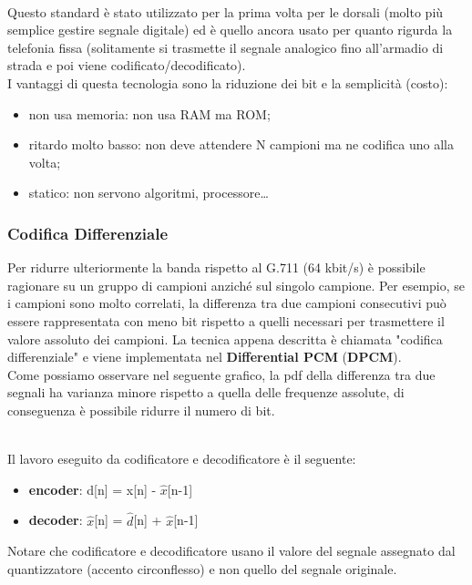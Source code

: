 \documentclass{article}
\begin{document}
				\\Questo standard è stato utilizzato per la prima volta per le dorsali (molto più semplice gestire segnale digitale) ed è quello ancora usato per quanto rigurda la telefonia fissa (solitamente si trasmette il segnale analogico fino all'armadio di strada e poi viene codificato/decodificato).
				\\I vantaggi di questa tecnologia sono la riduzione dei bit e la semplicità (costo):
				\begin{itemize}
					\item non usa memoria: non usa RAM ma ROM;
					\item ritardo molto basso: non deve attendere N campioni ma ne codifica uno alla volta;
					\item statico: non servono algoritmi, processore\dots
				\end{itemize}

			\subsubsection{Codifica Differenziale}
				Per ridurre ulteriormente la banda rispetto al G.711 (64 kbit/s) è possibile ragionare su un gruppo di campioni anziché sul singolo campione. Per esempio, se i campioni sono molto correlati, la differenza tra due campioni consecutivi può essere rappresentata con meno bit rispetto a quelli necessari per trasmettere il valore assoluto dei campioni. La tecnica appena descritta è chiamata "codifica differenziale" e viene implementata nel \textbf{Differential PCM} (\textbf{DPCM}).
				\\Come possiamo osservare nel seguente grafico, la pdf della differenza tra due segnali ha varianza minore rispetto a quella delle frequenze assolute, di conseguenza è possibile ridurre il numero di bit. 
				\begin{figure}[ht!]
				\end{figure}
				\\Il lavoro eseguito da codificatore e decodificatore è il seguente:
				\begin{itemize}
					\item \textbf{encoder}: d[n] = x[n] - $\hat{x}$[n-1]
					\item \textbf{decoder}: $\hat{x}$[n] = $\hat{d}$[n] + $\hat{x}$[n-1]
				\end{itemize}
				Notare che codificatore e decodificatore usano il valore del segnale assegnato dal quantizzatore (accento circonflesso) e non quello del segnale originale.
\end{document}
